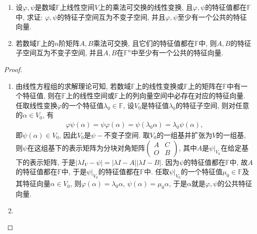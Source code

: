 \documentclass[../../main.tex]{subfiles}%
\begin{document}
\begin{proposition}\label{proposition:一般数域上乘法可交换诱导的性质}
\begin{enumerate}
\item 设\(\varphi,\psi\)是数域\(\mathbb{F}\)上线性空间\(V\)上的乘法可交换的线性变换, 且\(\varphi,\psi\)的特征值都在\(\mathbb{F}\)中, 求证: \(\varphi,\psi\)的特征子空间互为不变子空间, 并且\(\varphi,\psi\)至少有一个公共的特征向量.

\item 若数域\(\mathbb{F}\)上的\(n\)阶矩阵\(A,B\)乘法可交换, 且它们的特征值都在\(\mathbb{F}\)中, 则\(A,B\)的特征子空间互为不变子空间, 并且\(A,B\)在\(\mathbb{F}^n\)中至少有一个公共的特征向量.
\end{enumerate}
\end{proposition}
\begin{proof}
\begin{enumerate}
\item 由线性方程组的求解理论可知, 若数域\(\mathbb{F}\)上的线性变换或\(\mathbb{F}\)上的矩阵在\(\mathbb{F}\)中有一个特征值, 则在\(\mathbb{F}\)上的线性空间或\(\mathbb{F}\)上的列向量空间中必存在对应的特征向量. 任取线性变换\(\varphi\)的一个特征值\(\lambda_{0} \in \mathbb{F}\), 设\(V_{0}\)是特征值\(\lambda_{0}\)的特征子空间, 则对任意的\(\alpha \in V_{0}\), 有
\begin{align*}
\varphi\psi(\alpha)=\psi\varphi(\alpha)=\psi(\lambda_{0}\alpha)=\lambda_{0}\psi(\alpha),
\end{align*}
即\(\psi(\alpha) \in V_{0}\), 因此\(V_{0}\)是\(\psi -\)不变子空间. 取\(V_{0}\)的一组基并扩张为\(V\)的一组基, 则\(\psi\)在这组基下的表示矩阵为分块对角矩阵\(\begin{pmatrix}
A&C\\
O&B
\end{pmatrix}\), 其中\(A\)是\(\psi|_{V_{0}}\)在给定基下的表示矩阵, 于是\(|\lambda I_{V}-\psi| = |\lambda I - A||\lambda I - B|\). 因为\(\psi\)的特征值都在\(\mathbb{F}\)中, 故\(A\)的特征值都在\(\mathbb{F}\)中, 于是\(\psi|_{V_{0}}\)的特征值都在\(\mathbb{F}\)中. 任取\(\psi|_{V_{0}}\)的一个特征值\(\mu_{0} \in \mathbb{F}\)及其特征向量\(\alpha \in V_{0}\), 则\(\varphi(\alpha)=\lambda_{0}\alpha\), \(\psi(\alpha)=\mu_{0}\alpha\), 于是\(\alpha\)就是\(\varphi,\psi\)的公共特征向量. 

\item 
\end{enumerate}
\end{proof}
\end{document}
